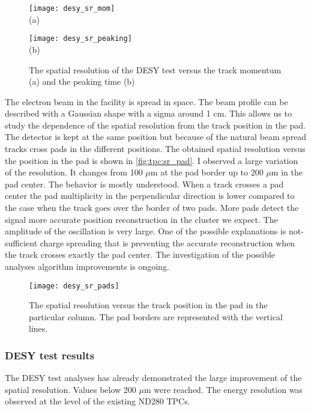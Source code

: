 \documentclass[../main.tex]{subfiles}
\begin{document}
\begin{figure}[!ht]
  \centering
  \begin{minipage}{0.49\linewidth}
    \centering
    \texttt{[image: desy\_sr\_mom]} \\ (a)
  \end{minipage}
  \begin{minipage}{0.49\linewidth}
    \centering
    \texttt{[image: desy\_sr\_peaking]} \\ (b)
  \end{minipage}
  \caption{The spatial resolution of the DESY test versus the track momentum (a) and the peaking time (b)}
  \label{fig:tpc:sr2}
\end{figure}

The electron beam in the facility is spread in space. The beam profile can be described with a Gaussian shape with a sigma around 1 cm. This allows us to study the dependence of the spatial resolution from the track position in the pad. The detector is kept at the same position but because of the natural beam spread tracks cross pads in the different positions. The obtained spatial resolution versus the position in the pad is shown in \autoref{fig:tpc:sr_pad}. I observed a large variation of the resolution. It changes from 100 $\mu\text{m}$ at the pad border up to 200 $\mu\text{m}$ in the pad center. The behavior is mostly understood. When a track crosses a pad center the pad multiplicity in the perpendicular direction is lower compared to the case when the track goes over the border of two pads. More pads detect the signal more accurate position reconstruction in the cluster we expect. The amplitude of the oscillation is very large. One of the possible explanations is not-sufficient charge spreading that is preventing the accurate reconstruction when the track crosses exactly the pad center. The investigation of the possible analyses algorithm improvements is ongoing.

\begin{figure}[!ht]
  \centering
  \texttt{[image: desy\_sr\_pads]}
  \caption{The spatial resolution versus the track position in the pad in the particular column. The pad borders are represented with the vertical lines.}
  \label{fig:tpc:sr_pad}
\end{figure}

\subsubsection{DESY test results}
The DESY test analyses has already demonstrated the large improvement of the spatial resolution. Values below 200 $\mu\text{m}$ were reached. The energy resolution was observed at the level of the existing ND280 TPCs.
\end{document}
